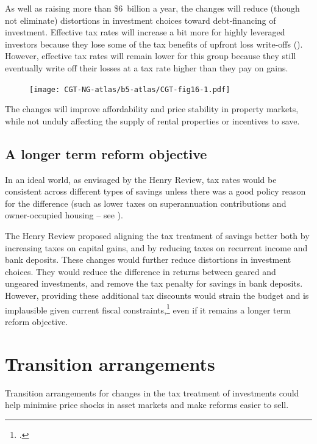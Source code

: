 As well as raising more than \$6~billion a year, the changes will reduce (though not eliminate) distortions in investment choices toward debt-financing of investment. Effective tax rates will increase a bit more for highly leveraged investors because they lose some of the tax benefits of upfront loss write-offs (). However, effective tax rates will remain lower for this group because they still eventually write off their losses at a tax rate higher than they pay on gains.  

\begin{figure}
\label{fig:16}
\texttt{[image: CGT-NG-atlas/b5-atlas/CGT-fig16-1.pdf]}
\end{figure}

The changes will improve affordability and price stability in property markets, while not unduly affecting the supply of rental properties or incentives to save.

\section{A longer term reform objective}\label{sec:A-longer-term-reform-objective}
In an ideal world, as envisaged by the Henry Review, tax rates would be consistent across different types of savings unless there was a good policy reason for the difference (such as lower taxes on superannuation contributions and owner-occupied housing – see ). 

The Henry Review proposed aligning the tax treatment of savings better both by increasing taxes on capital gains, and by reducing taxes on recurrent income and bank deposits. These changes would further reduce distortions in investment choices. They would reduce the difference in returns between geared and ungeared investments, and remove the tax penalty for savings in bank deposits. However, providing these additional tax discounts would strain the budget and is implausible given current fiscal constraints,\footcites{Daley2015} even if it remains a longer term reform objective.

\chapter{Transition arrangements}
Transition arrangements for changes in the tax treatment of investments could help minimise price shocks in asset markets and make reforms easier to sell. 

